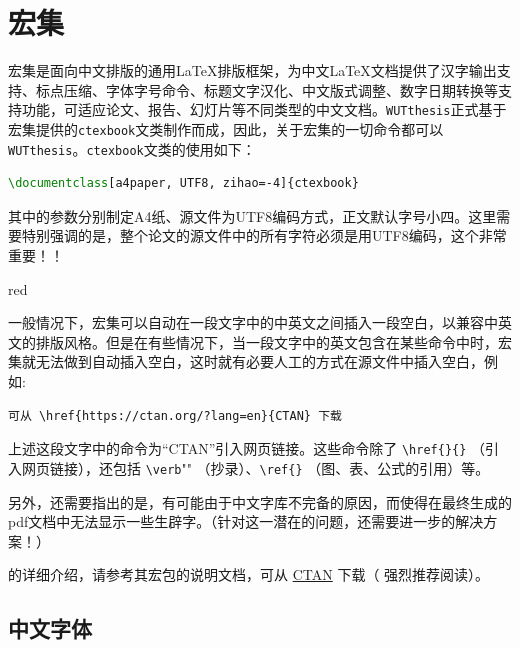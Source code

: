 \section{{\CTeX}宏集}


\par {\CTeX}宏集是面向中文排版的通用{\LaTeX}排版框架，为中文{\LaTeX}文档提供了汉字输出支持、标点压缩、字体字号命令、标题文字汉化、中文版式调整、数字日期转换等支持功能，可适应论文、报告、幻灯片等不同类型的中文文档。\texttt{WUTthesis}正式基于{\CTeX}宏集提供的\texttt{ctexbook}文类制作而成，因此，关于{\CTeX}宏集的一切命令都可以\texttt{WUTthesis}。\texttt{ctexbook}文类的使用如下：
\begin{lstlisting}[language=TeX]
\documentclass[a4paper, UTF8, zihao=-4]{ctexbook}
\end{lstlisting}
其中的参数分别制定A4纸、源文件为UTF8编码方式，正文默认字号小四。{\color{red}这里需要特别强调的是，整个论文的源文件中的所有字符必须是用UTF8编码，这个非常重要！！}


\begin{color}{red}
\par 一般情况下，{\CTeX}宏集可以自动在一段文字中的中英文之间插入一段空白，以兼容中英文的排版风格。但是在有些情况下，当一段文字中的英文包含在某些命令中时，{\CTeX}宏集就无法做到自动插入空白，这时就有必要人工的方式在源文件中插入空白，例如:
\begin{lstlisting}
可从 \href{https://ctan.org/?lang=en}{CTAN} 下载
\end{lstlisting}
上述这段文字中的命令为“CTAN”引入网页链接。这些命令除了 \verb"\href{}{}" （引入网页链接），还包括 \verb"\verb""" （抄录）、\verb"\ref{}" （图、表、公式的引用）等。
\end{color}

{\color{red}\par 另外，还需要指出的是，有可能由于中文字库不完备的原因，而使得在最终生成的pdf文档中无法显示一些生辟字。（针对这一潜在的问题，还需要进一步的解决方案！）}


\par {\CTeX}的详细介绍，请参考其宏包的说明文档，可从 \href{https://ctan.org/?lang=en}{CTAN} 下载（{\color{red} 强烈推荐阅读}）。



\subsection{中文字体}


